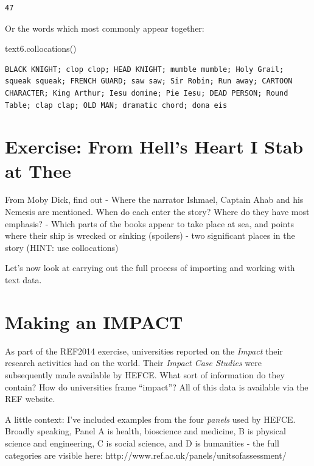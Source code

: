 \documentclass[
  letterpaper,
  DIV=11,
  numbers=noendperiod]{scrreprt}
\newenvironment{Shaded}{\begin{snugshade}}{\end{snugshade}}
\newcommand{\NormalTok}[1]{\textcolor[rgb]{0.00,0.23,0.31}{#1}}
\begin{document}
\begin{verbatim}
47
\end{verbatim}

Or the words which most commonly appear together:

\begin{Shaded}
\begin{Highlighting}[]
\NormalTok{text6.collocations()}
\end{Highlighting}
\end{Shaded}

\begin{verbatim}
BLACK KNIGHT; clop clop; HEAD KNIGHT; mumble mumble; Holy Grail;
squeak squeak; FRENCH GUARD; saw saw; Sir Robin; Run away; CARTOON
CHARACTER; King Arthur; Iesu domine; Pie Iesu; DEAD PERSON; Round
Table; clap clap; OLD MAN; dramatic chord; dona eis
\end{verbatim}

\hypertarget{exercise-from-hells-heart-i-stab-at-thee}{%
\section{Exercise: From Hell's Heart I Stab at
Thee}\label{exercise-from-hells-heart-i-stab-at-thee}}

From Moby Dick, find out - Where the narrator Ishmael, Captain Ahab and
his Nemesis are mentioned. When do each enter the story? Where do they
have most emphasis? - Which parts of the books appear to take place at
sea, and points where their ship is wrecked or sinking (spoilers) - two
significant places in the story (HINT: use collocations)

Let's now look at carrying out the full process of importing and working
with text data.

\hypertarget{making-an-impact}{%
\section{Making an IMPACT}\label{making-an-impact}}

As part of the REF2014 exercise, universities reported on the
\emph{Impact} their research activities had on the world. Their
\emph{Impact Case Studies} were subsequently made available by HEFCE.
What sort of information do they contain? How do universities frame
``impact''? All of this data is available via the REF website.

A little context: I've included examples from the four \emph{panels}
used by HEFCE. Broadly speaking, Panel A is health, bioscience and
medicine, B is physical science and engineering, C is social science,
and D is humanities - the full categories are visible here:
http://www.ref.ac.uk/panels/unitsofassessment/
\end{document}
